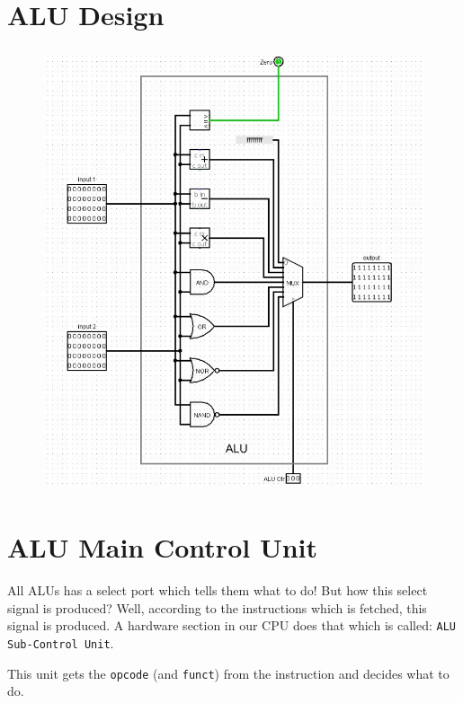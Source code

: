 \documentclass[12pt, dvipsnames, svgnames, x11names, oneside]{book}
\begin{document}
\section{ALU Design}\label{sec:alu-design}
\begin{figure}[H]
\begin{center}
\includegraphics[width=\textwidth, height=13cm]{./images/alu}
\end{center}
\end{figure}

\clearpage
\section{ALU Main Control Unit}\label{sec:alu-sub}
All ALUs has a select port which tells them what to do! But how this select signal is produced? Well, according to the instructions which is fetched, this signal is produced. A hardware section in our CPU does that which is called: \texttt{ALU Sub-Control Unit}.

This unit gets the \texttt{opcode} (and \texttt{funct}) from the instruction and decides what to do. 
\end{document}
